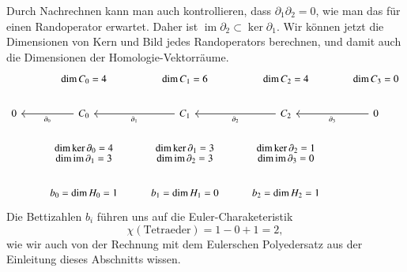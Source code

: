 Durch Nachrechnen kann man auch kontrollieren, dass $\partial_1\partial_2=0$,
wie man das für einen Randoperator erwartet.
Daher ist $\operatorname{im}\partial_2\subset \operatorname{ker}\partial_1$.
Wir können jetzt die Dimensionen von Kern und Bild jedes Randoperators 
berechnen, und damit auch die Dimensionen der Homologie-Vektorräume.
\[
\begin{tikzcd}
	&\operatorname{dim}C_0=4
		&\operatorname{dim}C_1=6
			&\operatorname{dim}C_2=4
				&\operatorname{dim}C_3=0
\\
0
	&C_0 \ar[l,"\partial_0"]
		&C_1 \ar[l,"\partial_1"]
			&C_2 \ar[l,"\partial_2"]
				&0 \ar[l,"\partial_3"]
\\
	&{\textstyle \dim\operatorname{ker}\partial_0 = 4\atop
	 \textstyle \dim\operatorname{im}\partial_1 = 3}
		&{\textstyle\dim\operatorname{ker}\partial_1 = 3\atop
		  \textstyle\dim\operatorname{im}\partial_2 = 3}
			&{\textstyle\dim\operatorname{ker}\partial_2 = 1\atop
			  \textstyle\dim\operatorname{im}\partial_3 = 0}
\\
	&b_0=\dim H_0=1
		&b_1=\dim H_1=0
			&b_2=\dim H_2=1
\end{tikzcd}
\]
Die Bettizahlen $b_i$ führen uns auf die Euler-Charaketeristik
\[
\chi(\text{Tetraeder})
=
1 - 0 + 1 = 2,
\]
wie wir auch von der Rechnung mit dem Eulerschen Polyedersatz
aus der Einleitung dieses Abschnitts wissen.


